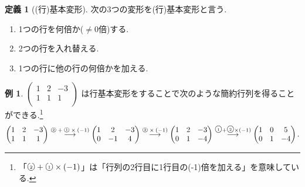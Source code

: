 \documentclass[dvipdfmx,a4paper,11pt]{article}
\newcommand{\maru}[1]{\raise0.2ex\hbox{\textcircled{\tiny{#1}}}}
\theoremstyle{definition}
\newtheorem{dfn}[thm]{定義}
\newtheorem{exa}[thm]{例}
\begin{document}
\begin{tcolorbox}[
    colback = white,
    colframe = green!35!black,
    fonttitle = \bfseries,
    breakable = true]
    \begin{dfn}[(行)基本変形]
 次の3つの変形を(行)基本変形と言う. 
 \begin{enumerate}
   	\setlength{\parskip}{0cm}
  	\setlength{\itemsep}{0pt} 
 \item 1つの行を何倍か($\neq 0$倍)する.
 \item 2つの行を入れ替える.
 \item 1つの行に他の行の何倍かを加える.
 \end{enumerate}
 \end{dfn}
 \end{tcolorbox}
 
 
 \begin{exa}
 \label{exa-kanyaku-1}
$
 \begin{pmatrix}
 1& 2& -3  \\
 1& 1& 1  \\
 \end{pmatrix}
 $
は行基本変形をすることで次のような簡約行列を得ることができる.\footnote{「$\maru{2} + \maru{1}\times(-1)$」は「行列の2行目に1行目の(-1)倍を加える」を意味している.}
 \begin{align*}
  \begin{pmatrix}
 1& 2& -3  \\
 1& 1& 1  \\
 \end{pmatrix}
 \overset{\text{$\maru{2} + \maru{1}\times(-1)$}}{\longrightarrow} 
   \begin{pmatrix}
 1& 2& -3  \\
 0& -1& 4  \\
 \end{pmatrix}
 \overset{\text{$\maru{2} \times(-1)$}}{\longrightarrow} 
   \begin{pmatrix}
 1& 2& -3  \\
 0& 1& -4  \\
 \end{pmatrix}
  \overset{\maru{1} + \maru{2}\times(-1)}{\longrightarrow} 
   \begin{pmatrix}
 1& 0& 5  \\
 0& 1& -4  \\
 \end{pmatrix}.
  \end{align*}
\end{exa}
\end{document}
